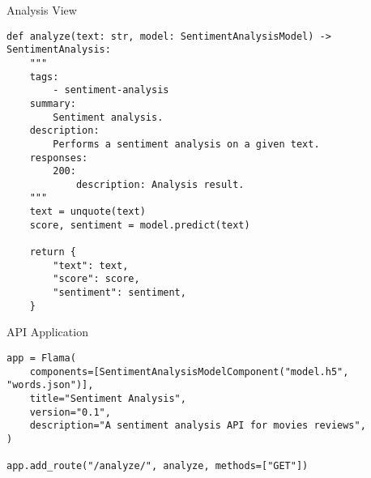 \begin{frame}[fragile]{Analysis View}
    \begin{verbatim}
def analyze(text: str, model: SentimentAnalysisModel) -> SentimentAnalysis:
    """
    tags:
        - sentiment-analysis
    summary:
        Sentiment analysis.
    description:
        Performs a sentiment analysis on a given text.
    responses:
        200:
            description: Analysis result.
    """
    text = unquote(text)
    score, sentiment = model.predict(text)

    return {
        "text": text,
        "score": score,
        "sentiment": sentiment,
    }
    \end{verbatim}
\end{frame}

\begin{frame}[fragile]{API Application}
    \begin{verbatim}
app = Flama(
    components=[SentimentAnalysisModelComponent("model.h5", "words.json")],
    title="Sentiment Analysis",
    version="0.1",
    description="A sentiment analysis API for movies reviews",
)

app.add_route("/analyze/", analyze, methods=["GET"])
    \end{verbatim}
\end{frame}
